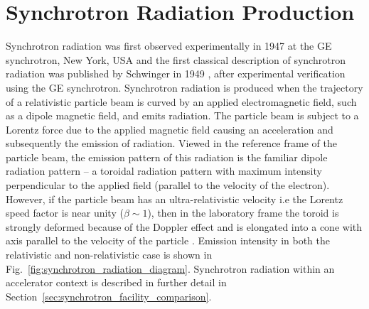 \documentclass[../main.tex]{subfiles}
\begin{document}
\section{Synchrotron Radiation Production}

Synchrotron radiation was first observed experimentally in 1947 at the GE synchrotron, New York, USA \cite{elder1948radiation} and the first classical description of synchrotron radiation was published by Schwinger in 1949 \cite{schwinger1949classical}, after experimental verification using the GE synchrotron. Synchrotron radiation is produced when the trajectory of a relativistic particle beam is curved by an applied electromagnetic field, such as a dipole magnetic field, and emits radiation. The particle beam is subject to a Lorentz force due to the applied magnetic field causing an acceleration and subsequently the emission of radiation. Viewed in the reference frame of the particle beam, the emission pattern of this radiation is the familiar dipole radiation pattern -- a toroidal radiation pattern with maximum intensity perpendicular to the applied field (parallel to the velocity of the electron). However, if the particle beam has an ultra-relativistic velocity i.e the Lorentz speed factor is near unity ($\beta\sim1$), then in the laboratory frame the toroid is strongly deformed because of the Doppler effect and is elongated into a cone with axis parallel to the velocity of the particle \cite{ternov1995synchrotron}. Emission intensity in both the relativistic and non-relativistic case is shown in Fig.~\ref{fig:synchrotron_radiation_diagram}. Synchrotron radiation within an accelerator context is described in further detail in Section~\ref{sec:synchrotron_facility_comparison}.
\end{document}
